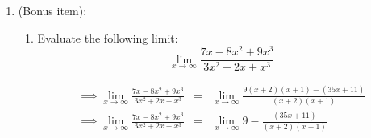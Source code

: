 \documentclass[10pt,paper=letter]{scrartcl}
\begin{document}
\begin{enumerate}[resume, label=\arabic*.,font=\bfseries]
     
     \sol 
    
    \begin{equation*}
        \begin{array}{lll}
          \implies\displaystyle \mathop {\lim }\limits_{y \to 7} \frac{{{y^2} - 4y - 21}}{{3{y^2} - 17y - 28}}  & = & \displaystyle \mathop {\lim }\limits_{y \to 7} \frac{(y-7)(y+3)}{{(3y+4)(y-7)}}\\
             
             \implies\displaystyle \mathop {\lim }\limits_{y \to 7} \frac{{{y^2} - 4y - 21}}{{3{y^2} - 17y - 28}}  & = & \displaystyle \mathop {\lim }\limits_{y \to 7} \frac{y+3}{{3y+4}}\\
                  
             \implies\displaystyle \mathop {\lim }\limits_{y \to 7} \frac{{{y^2} - 4y - 21}}{{3{y^2} - 17y - 28}}  & = & \displaystyle \mathop {\lim }\limits_{y \to 7} \frac{(7)+3}{{3(7)+4}} = \dfrac{10}{25} = \fbox{$\dfrac{2}{5}$}\\
             
        \end{array}
    \end{equation*}
    
    \item (Bonus item): 
    
    
    \begin{enumerate}
        \item[(a)] Evaluate the following limit: $$\displaystyle \mathop {\lim }\limits_{x \to \infty} \frac{7x - 8x^2 +9x^3}{{3x^2 +2x + x^3}}$$
        
        
        \sol
        
        \begin{equation*}
            \begin{array}{lll}
                \implies \displaystyle \mathop {\lim }\limits_{x \to \infty} \frac{7x - 8x^2 +9x^3}{{3x^2 +2x + x^3}} & = & \displaystyle \mathop {\lim }\limits_{x \to \infty} \frac{9(x+2)(x+1) - (35x +11)}{(x+2)(x+1)}\\
                 
                \implies \displaystyle \mathop {\lim }\limits_{x \to \infty} \frac{7x - 8x^2 +9x^3}{{3x^2 +2x + x^3}} & = & \displaystyle \mathop {\lim }\limits_{x \to \infty} 9 - \frac{(35x +11)}{(x+2)(x+1)}\\
                

\end{array}
\end{equation*}
\end{enumerate}
\end{enumerate}
\end{document}
